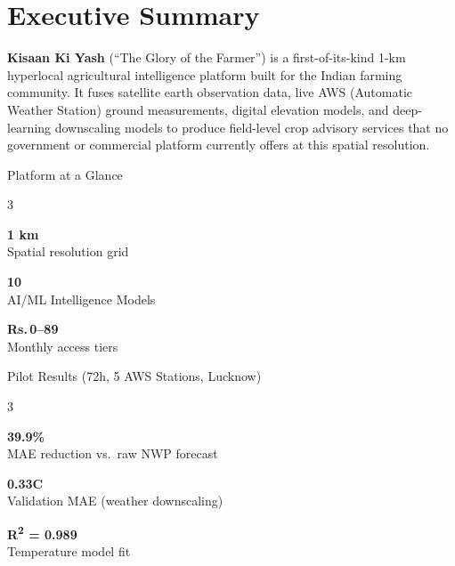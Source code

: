 \documentclass[12pt,a4paper]{article}
\newcommand{\Rup}{\textbf{Rs.\,}}
\begin{document}
\pagecolor{white}
\newpage
\tableofcontents
\newpage

\section{Executive Summary}

\textbf{Kisaan Ki Yash} (``The Glory of the Farmer'') is a first-of-its-kind 1-km hyperlocal agricultural intelligence platform built for the Indian farming community. It fuses satellite earth observation data, live AWS (Automatic Weather Station) ground measurements, digital elevation models, and deep-learning downscaling models to produce field-level crop advisory services that no government or commercial platform currently offers at this spatial resolution.

\begin{kpibox}{Platform at a Glance}
\begin{multicols}{3}
\begin{center}
{\Large\bfseries\color{primaryGreen}1 km} \\
\small Spatial resolution grid

\columnbreak

{\Large\bfseries\color{primaryGreen}10} \\
\small AI/ML Intelligence Models

\columnbreak

{\Large\bfseries\color{primaryGreen}\Rup 0--89} \\
\small Monthly access tiers
\end{center}
\end{multicols}
\end{kpibox}

\vspace{4pt}

\begin{kpibox}{Pilot Results (72h, 5 AWS Stations, Lucknow)}
\begin{multicols}{3}
\begin{center}
{\Large\bfseries\color{primaryGreen}39.9\%} \\
\small MAE reduction vs.\ raw NWP forecast

\columnbreak

{\Large\bfseries\color{primaryGreen}0.33\textdegree C} \\
\small Validation MAE (weather downscaling)

\columnbreak

{\Large\bfseries\color{primaryGreen}R\textsuperscript{2} = 0.989} \\
\small Temperature model fit
\end{center}
\end{multicols}
\end{kpibox}
\end{document}
